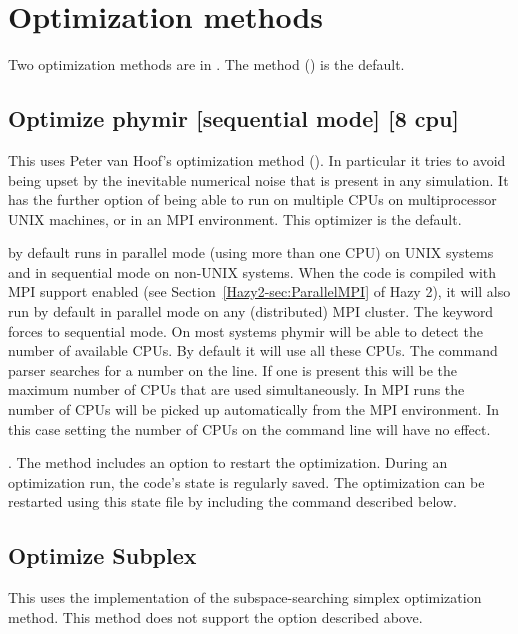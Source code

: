 \section{Optimization methods}
\label{sec:optimization_methods}

Two optimization methods are in \Cloudy.
The  method (\citealp{VanHoof1997}) is the default.

\subsection{Optimize phymir [sequential mode] [8 cpu]}
\label{sec:OptPhymir}

This uses Peter van Hoof's  optimization method
(\citealp{VanHoof1997}). In particular it tries to avoid being upset by the
inevitable numerical noise that is present in any simulation. It has the
further option of being able to run on multiple CPUs on multiprocessor UNIX
machines, or in an MPI environment. This optimizer is the default.

 by default runs in parallel mode (using more than one CPU) on
UNIX systems and in sequential mode on non-UNIX systems. When the code is
compiled with MPI support enabled (see Section~\ref{Hazy2-sec:ParallelMPI} of Hazy 2), it will also run
by default in parallel mode on any (distributed) MPI cluster. The keyword
 forces  to sequential mode. On most
systems phymir will be able to detect the number of available CPUs. By default
it will use all these CPUs. The command parser searches for a number on the
line. If one is present this will be the maximum number of CPUs that are used
simultaneously. In MPI runs the number of CPUs will be picked up automatically
from the MPI environment. In this case setting the number of CPUs on the
command line will have no effect.

. The  method includes an option to
restart the optimization. During an optimization run, the code's state is
regularly saved. The optimization can be
restarted using this state file by including the command  described below.

\subsection{Optimize Subplex}

This uses the \citet{Rowan1990} implementation of the subspace-searching
simplex optimization method. This method does not support the
 option described above.

